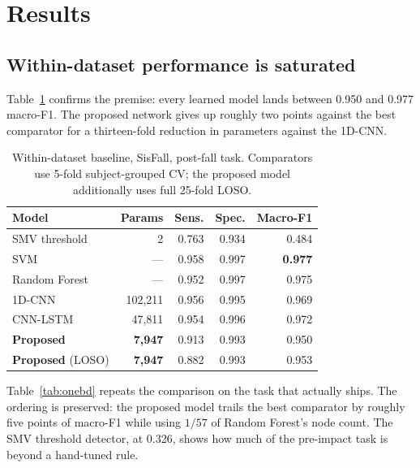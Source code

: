 \documentclass[conference]{IEEEtran}
\begin{document}
\section{Results}

\subsection{Within-dataset performance is saturated}

Table~\ref{tab:one} confirms the premise: every learned model lands between 0.950 and
0.977 macro-F1. The proposed network gives up roughly two points against the best
comparator for a thirteen-fold reduction in parameters against the 1D-CNN.

\begin{table}[t]
\caption{Within-dataset baseline, SisFall, post-fall task. Comparators use 5-fold
subject-grouped CV; the proposed model additionally uses full 25-fold LOSO.}
\label{tab:one}
\centering\small
\begin{tabular}{lrrrr}
\toprule
Model & Params & Sens. & Spec. & Macro-F1 \\
\midrule
SMV threshold  & 2         & 0.763 & 0.934 & 0.484 \\
SVM            & ---       & 0.958 & 0.997 & \textbf{0.977} \\
Random Forest  & ---       & 0.952 & 0.997 & 0.975 \\
1D-CNN         & 102{,}211 & 0.956 & 0.995 & 0.969 \\
CNN-LSTM       & 47{,}811  & 0.954 & 0.996 & 0.972 \\
\textbf{Proposed} & \textbf{7{,}947} & 0.913 & 0.993 & 0.950 \\
\textbf{Proposed} (LOSO) & \textbf{7{,}947} & 0.882 & 0.993 & 0.953 \\
\bottomrule
\end{tabular}
\end{table}

Table~\ref{tab:onebd} repeats the comparison on the task that actually ships. The
ordering is preserved: the proposed model trails the best comparator by roughly five
points of macro-F1 while using $1/57$ of Random Forest's node count. The SMV threshold
detector, at 0.326, shows how much of the pre-impact task is beyond a hand-tuned rule.
\end{document}
